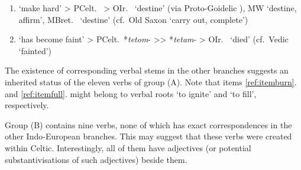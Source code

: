 \documentclass[output=paper,colorlinks,citecolor=brown]{langscibook}
\begin{document}
\begin{itemize}
\begin{enumerate}
    \item {} ‘make hard’ > PCelt.\  > OIr.\   ‘destine’ (via Proto-Goidelic ), MW  ‘destine, affirm’, MBret.\  ‘destine’ 
        (cf.\ Old Saxon  ‘carry out, complete’)
        
    \item {} ‘has become faint’ > PCelt.\ *\textit{tetom}- >{>} *\textit{tetam}- > OIr.\   ‘died’
        (cf.\ Vedic  ‘fainted’)
\end{enumerate}
\end{itemize}

The existence of corresponding verbal stems in the other branches suggests an inherited status of the eleven verbs of group (A). Note that items \ref{ref:itemburn}. and \ref{ref:itemfull}. might belong to verbal roots ‘to ignite’ and ‘to fill’, respectively.

Group (B) contains nine verbs, none of which has exact correspondences in the other Indo-European branches. This may suggest that these verbs were created within Celtic. Interestingly, all of them have adjectives (or potential substantivisations of such adjectives) beside them.
\end{document}

